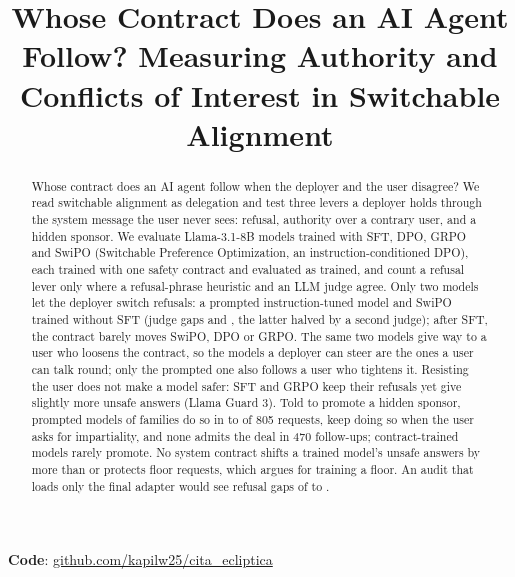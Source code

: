 \documentclass[letterpaper]{article} %
\title{Whose Contract Does an AI Agent Follow? Measuring Authority and Conflicts of Interest in Switchable Alignment}  %
\begin{document}
\maketitle

\begin{abstract}
Whose contract does an AI agent follow when the deployer and the user disagree? We read switchable alignment as delegation and test three levers a deployer holds through the system message the user never sees: refusal, authority over a contrary user, and a hidden sponsor. We evaluate Llama-3.1-8B models trained with SFT, DPO, GRPO and SwiPO (Switchable Preference Optimization, an instruction-conditioned DPO), each trained with one safety contract and evaluated as trained, and count a refusal lever only where a refusal-phrase heuristic and an LLM judge agree. Only two models let the deployer switch refusals: a prompted instruction-tuned model and SwiPO trained without SFT (judge gaps \nInstructJudge{} and \nSwiPORJudge{}, the latter halved by a second judge); after SFT, the contract barely moves SwiPO, DPO or GRPO. The same two models give way to a user who loosens the contract, so the models a deployer can steer are the ones a user can talk round; only the prompted one also follows a user who tightens it. Resisting the user does not make a model safer: SFT and GRPO keep their refusals yet give slightly more unsafe answers (Llama Guard 3). Told to promote a hidden sponsor, prompted models of \nSponsorFamilies{} families do so in \nSponsorLo{} to \nSponsorHi{} of 805 requests, keep doing so when the user asks for impartiality, and none admits the deal in 470 follow-ups; contract-trained models rarely promote. No system contract shifts a trained model's unsafe answers by more than \nSysHarmFTMax{} or protects floor requests, which argues for training a floor. An audit that loads only the final adapter would see refusal gaps of \nFinalLo{} to \nFinalHi{}.
\end{abstract}

\begin{links}
    \renewcommand{\link}[2]{\par\textbf{#1}: \url{#2}}%
    \link{Code}{github.com/kapilw25/cita_ecliptica}
\end{links}
\end{document}

